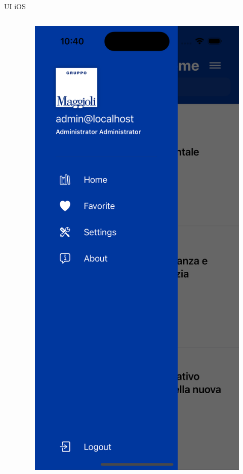 \begin{frame}{UI iOS}
\begin{columns}[onlytextwidth]
\begin{column}{0.24\textwidth}
        \end{column}
        \begin{column}{0.24\textwidth}
        
             \begin{figure}[H]
                \includegraphics[width=1\textwidth]{img/sidenav_ios.png}
            \end{figure}
            

\end{column}
\end{columns}
\end{frame}
